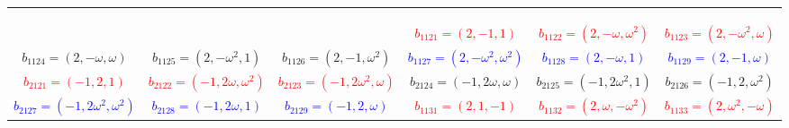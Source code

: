\documentclass[%
  reprint,
  superscriptaddress,
  showkeys,
  amsmath,amssymb,
  aps,pra,
  longbibliography,
  floatfix,
  x11names
]{revtex4-2}
\DeclareRobustCommand{\chgbox}[1]{{\setlength{\fboxsep}{0.8pt}\fcolorbox{blue}{white}{#1}}}
\begin{document}
\begin{table}[htbp!]
\begin{ruledtabular}
\begin{tabular}{*{6}{c}}
\chgbox{\textcolor{blue}{$e_{17}=(2\omega,1,1)$}} & \chgbox{\textcolor{blue}{$e_{18}=(2\omega,\omega^2,\omega)$}} & \chgbox{\textcolor{blue}{$e_{19}=(2\omega,\omega,\omega^2)$}} & \chgbox{\textcolor{red}{$e_{21}=(1,2,1)$}} & \chgbox{\textcolor{red}{$e_{22}=(\omega^2,2,\omega)$}} & \chgbox{\textcolor{red}{$e_{23}=(\omega,2,\omega^2)$}} \\
\chgbox{\textcolor{green!40!black}{$e_{24}=(\omega,2\omega^2,\omega^2)$}} & \chgbox{\textcolor{green!40!black}{$e_{25}=(1,2\omega^2,1)$}} & \chgbox{\textcolor{green!40!black}{$e_{26}=(\omega^2,2\omega^2,\omega)$}} & \chgbox{\textcolor{blue}{$e_{27}=(\omega^2,2\omega,\omega)$}} & \chgbox{\textcolor{blue}{$e_{28}=(1,2\omega,1)$}} & \chgbox{\textcolor{blue}{$e_{29}=(\omega,2\omega,\omega^2)$}} \\
\chgbox{\textcolor{red}{$e_{31}=(1,1,2)$}} & \chgbox{\textcolor{red}{$e_{32}=(\omega,\omega^2,2)$}} & \chgbox{\textcolor{red}{$e_{33}=(\omega^2,\omega,2)$}} & \chgbox{\textcolor{green!40!black}{$e_{34}=(\omega,\omega^2,2\omega^2)$}} & \chgbox{\textcolor{green!40!black}{$e_{35}=(\omega^2,\omega,2\omega^2)$}} & \chgbox{\textcolor{green!40!black}{$e_{36}=(1,1,2\omega^2)$}} \\
\chgbox{\textcolor{blue}{$e_{37}=(\omega^2,\omega,2\omega)$}} & \chgbox{\textcolor{blue}{$e_{38}=(\omega,\omega^2,2\omega)$}} & \chgbox{\textcolor{blue}{$e_{39}=(1,1,2\omega)$}} & \textcolor{red}{$b_{1121}=(2,-1,1)$} & \textcolor{red}{$b_{1122}=(2,-\omega,\omega^2)$} & \textcolor{red}{$b_{1123}=(2,-\omega^2,\omega)$} \\
\textcolor{green!40!black}{$b_{1124}=(2,-\omega,\omega)$} & \textcolor{green!40!black}{$b_{1125}=(2,-\omega^2,1)$} & \textcolor{green!40!black}{$b_{1126}=(2,-1,\omega^2)$} & \textcolor{blue}{$b_{1127}=(2,-\omega^2,\omega^2)$} & \textcolor{blue}{$b_{1128}=(2,-\omega,1)$} & \textcolor{blue}{$b_{1129}=(2,-1,\omega)$} \\
\textcolor{red}{$b_{2121}=(-1,2,1)$} & \textcolor{red}{$b_{2122}=(-1,2\omega,\omega^2)$} & \textcolor{red}{$b_{2123}=(-1,2\omega^2,\omega)$} & \textcolor{green!40!black}{$b_{2124}=(-1,2\omega,\omega)$} & \textcolor{green!40!black}{$b_{2125}=(-1,2\omega^2,1)$} & \textcolor{green!40!black}{$b_{2126}=(-1,2,\omega^2)$} \\
\textcolor{blue}{$b_{2127}=(-1,2\omega^2,\omega^2)$} & \textcolor{blue}{$b_{2128}=(-1,2\omega,1)$} & \textcolor{blue}{$b_{2129}=(-1,2,\omega)$} & \textcolor{red}{$b_{1131}=(2,1,-1)$} & \textcolor{red}{$b_{1132}=(2,\omega,-\omega^2)$} & \textcolor{red}{$b_{1133}=(2,\omega^2,-\omega)$} \\

\end{tabular}
\end{ruledtabular}
\end{table}
\end{document}

